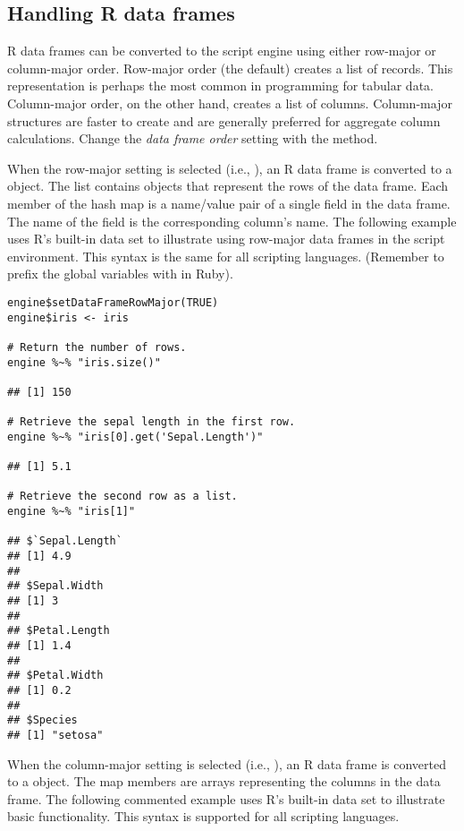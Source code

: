 \hypertarget{handlingrdataframes}{\subsection{Handling R data frames}}

R data frames can be converted to the script engine using either row-major or column-major order. Row-major order (the default) creates a list of records. This representation is perhaps the most common in programming for tabular data. Column-major order, on the other hand, creates a list of columns. Column-major structures are faster to create and are generally preferred for aggregate column calculations. Change the \textit{data frame order} setting with the  method.

When the row-major setting is selected (i.e., ), an R data frame is converted to a \href{https://docs.oracle.com/javase/8/docs/api/java/util/ArrayList.html}{} object. The list contains  \href{https://docs.oracle.com/javase/8/docs/api/java/util/LinkedHashMap.html}{} objects that represent the rows of the data frame. Each member of the hash map is a name/value pair of a single field in the data frame. The name of the field is the corresponding column's name. The following example uses R's built-in  data set to illustrate using row-major data frames in the script environment. This syntax is the same for all scripting languages. (Remember to prefix the global variables with \code{\$} in Ruby).

\begin{verbatim}
engine$setDataFrameRowMajor(TRUE)
engine$iris <- iris

# Return the number of rows.
engine %~% "iris.size()"

## [1] 150

# Retrieve the sepal length in the first row.
engine %~% "iris[0].get('Sepal.Length')"

## [1] 5.1

# Retrieve the second row as a list.
engine %~% "iris[1]"

## $`Sepal.Length`
## [1] 4.9
## 
## $Sepal.Width
## [1] 3
## 
## $Petal.Length
## [1] 1.4
## 
## $Petal.Width
## [1] 0.2
## 
## $Species
## [1] "setosa"
\end{verbatim}

When the column-major setting is selected (i.e., ), an R data frame is converted to a \href{https://docs.oracle.com/javase/8/docs/api/java/util/LinkedHashMap.html}{} object. The map members are arrays representing the columns in the data frame. The following commented example uses R's built-in  data set to illustrate basic functionality. This syntax is supported for all scripting languages.

